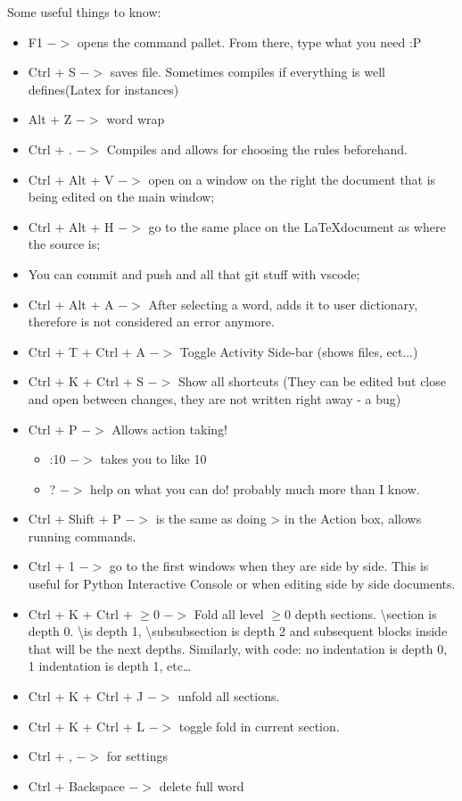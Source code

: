 \par Some useful things to know:
\begin{itemize}
    \item F1 $->$ opens the command pallet. From there, type what you need :P
    \item Ctrl + S $->$ saves file. Sometimes compiles if everything is well defines(Latex for instances)
    \item Alt + Z $->$ word wrap
    \item Ctrl + . $->$ Compiles and allows for choosing the rules beforehand.
    \item Ctrl + Alt + V $->$ open on a window on the right the document that is being edited on the main window;
    \item Ctrl + Alt + H $->$ go to the same place on the \LaTeX document as where the source is;
    \item You can commit and push and all that git stuff with vscode;
    \item Ctrl + Alt + A $->$ After selecting a word, adds it to user dictionary, therefore is not considered an error anymore.
    \item Ctrl + T + Ctrl + A $->$ Toggle Activity Side-bar (shows files, ect...)
    \item Ctrl + K + Ctrl + S $->$ Show all shortcuts (They can be edited but close and open between changes, they are not written right away - a bug)
    \item Ctrl + P $->$ Allows action taking! 
        \begin{itemize}
            \item :10 $->$ takes you to like 10
            \item ? $->$ help on what you can do! probably much more than I know.
        \end{itemize}
    \item Ctrl + Shift + P $->$ is the same as doing > in the Action box, allows running commands.
    \item Ctrl + 1 $->$ go to the first windows when they are side by side. This is useful for Python Interactive Console or when editing side by side documents.
    \item Ctrl + K + Ctrl + $\geq 0$ $->$ Fold all level $\geq 0$ depth sections. \textbackslash section is depth 0. \textbackslash  is depth 1, \textbackslash subsubsection is depth 2 and subsequent blocks inside that will be the next depths. Similarly, with code: no indentation is depth 0, 1 indentation is depth 1, etc\dots
    \item Ctrl + K + Ctrl + J $->$ unfold all sections.
    \item Ctrl + K + Ctrl + L $->$ toggle fold in current section.
    \item Ctrl + , $->$ for settings
    \item Ctrl + Backspace $->$ delete full word
\end{itemize}

